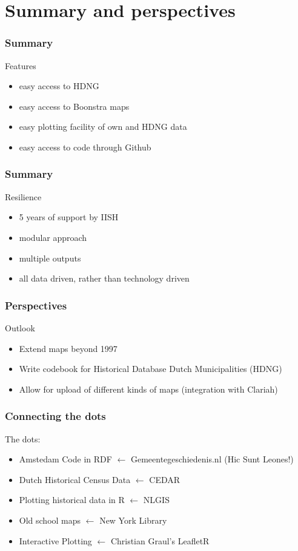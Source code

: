 \documentclass{beamer}
\begin{document}
\section{Summary and perspectives}
\begin{frame}
	\frametitle{Summary}
	Features
		\begin{itemize}
			\item easy access to HDNG
			\item easy access to Boonstra maps
			\item easy plotting facility of own and HDNG data
			\item easy access to code through Github
		\end{itemize}
\end{frame}


\begin{frame}
	\frametitle{Summary}	
	Resilience
		\begin{itemize}
			\item 5 years of support by IISH
			\item modular approach
			\item multiple outputs
			\item all data driven, rather than technology driven
		\end{itemize}		
\end{frame}

\begin{frame}
	\frametitle{Perspectives}
	Outlook
		\begin{itemize}
			\item Extend maps beyond 1997
			\item Write codebook for Historical Database Dutch Municipalities (HDNG)
			\item Allow for upload of different kinds of maps (integration with Clariah)
		\end{itemize}
\end{frame}

\begin{frame}
	\frametitle{Connecting the dots}
	The dots:
	\begin{itemize}
		\item Amstedam Code in RDF $\leftarrow$ Gemeentegeschiedenis.nl (Hic Sunt Leones!)
		\item Dutch Historical Census Data $\leftarrow$ CEDAR
		\item Plotting historical data in R $\leftarrow$ NLGIS
		\item Old school maps $\leftarrow$ New York Library
		\item Interactive Plotting $\leftarrow$ Christian Graul's LeafletR
	\end{itemize}
\end{frame}
\end{document}
